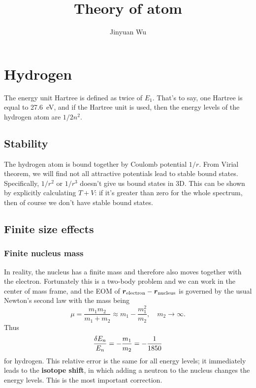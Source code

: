 \documentclass[hyperref, a4paper]{article}
\title{Theory of atom}
\author{Jinyuan Wu}
\newcommand*{\concept}[1]{{\textbf{#1}}}
\begin{document}
\maketitle

\section{Hydrogen}

The energy unit Hartree is defined as twice of $E_1$.
That's to say, one Hartree is equal to \SI{27.6}{eV},
and if the Hartree unit is used, 
then the energy levels of the hydrogen atom are 
$1 / 2n^2$.

\subsection{Stability}

The hydrogen atom is bound together by Coulomb potential $1 / r$.
From Virial theorem, we will find not all attractive potentials lead to stable bound states. 
Specifically, $1 / r^2$ or $1 / r^3$ doesn't give us bound states in 3D.
This can be shown by explicitly calculating $T + V$: 
if it's greater than zero for the whole spectrum, 
then of course we don't have stable bound states. 

\subsection{Finite size effects}

\subsubsection{Finite nucleus mass}

In reality, the nucleus has a finite mass 
and therefore also moves together with the electron.
Fortunately this is a two-body problem 
and we can work in the center of mass frame,
and the EOM of $\vb*{r}_{\text{electron}} - \vb*{r}_{\text{nucleus}}$
is governed by the usual Newton's second law 
with the mass being
\begin{equation}
    \mu = \frac{m_1 m_2}{m_1 + m_2} \approx m_1 - \frac{m_1^2}{m_2}, \quad m_2 \to \infty.
\end{equation}
Thus 
\begin{equation}
    \frac{\var{E_n}}{E_n} = - \frac{m_1}{m_2} = - \frac{1}{1850}
\end{equation}
for hydrogen.
This relative error is the same for all energy levels; 
it immediately leads to the \concept{isotope shift},
in which adding a neutron to the nucleus 
changes the energy levels.
This is the most important correction.
\end{document}
